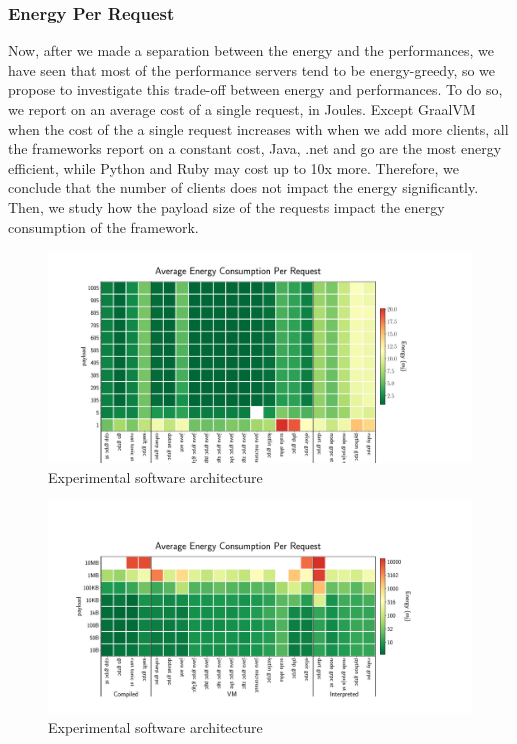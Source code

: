 \subsubsection{Energy Per Request}
Now, after we made a separation between the energy and the performances, we have seen that most of the performance servers tend to be energy-greedy, so we propose to investigate this trade-off between energy and performances.
To do so, we report on an average cost of a single request, in Joules.
Except GraalVM when the cost of the a single request increases with when we add more clients, all the frameworks report on a constant cost, Java, .net and go are the most energy efficient, while Python and Ruby may cost up to 10x more.
Therefore, we conclude that the number of clients does not impact the energy significantly.
Then, we study how the payload size of the requests impact the energy consumption of the framework.

\begin{figure}[!hbt]
    \begin{center}
        \includegraphics[width=1.2\linewidth]{imgs/rpc_images/energy_cost_clients}
    \end{center}
    \caption{Experimental software architecture}\label{fig:rpcprotocol}
\end{figure}

\begin{figure}[!hbt]
    \begin{center}
        \includegraphics[width=1.2\linewidth]{imgs/rpc_images/energy_cost_payload}
    \end{center}
    \caption{Experimental software architecture}\label{fig:energy_cost_payload}
\end{figure}

